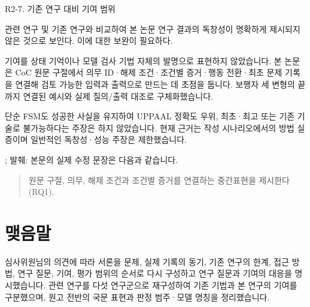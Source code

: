 \clearpage

\begin{reviewitem}{R2-7. 기존 연구 대비 기여 범위}

\begin{reviewercomment}

관련 연구 및 기존 연구와 비교하여 본 논문 연구 결과의 독창성이 명확하게 제시되지 않은 것으로 보인다. 이에 대한 보완이 필요하다.

\end{reviewercomment}

\begin{authorresponse}

기여를 상태 기억이나 모델 검사 기법 자체의 발명으로 표현하지 않았습니다. 본 논문은 CoC 원문 구절에서 의무 ID·해제 조건·조건별 증거·행동 전환·최초 문제 기록을 연결해 검토 가능한 입력과 출력으로 만드는 데 초점을 둡니다. 보행자 세 변형의 끝까지 연결된 예시와 실제 질의/출력 대조로 구체화했습니다.

단순 FSM도 성공한 사실을 유지하여 UPPAAL 정확도 우위, 최초·최고 또는 기존 기술로 불가능하다는 주장은 하지 않았습니다. 현재 근거는 작성 시나리오에서의 방법 실증이며 일반적인 독창성·성능 주장은 제한했습니다.

\end{authorresponse}

\begin{manuscriptrevision}{; 발췌: }
본문의 실제 수정 문장은 다음과 같습니다.

\begin{quote}
원문 구절, 의무, 해제 조건과 조건별 증거를 연결하는 중간표현을 제시한다 (RQ1).
\end{quote}
\end{manuscriptrevision}

\end{reviewitem}

\section*{맺음말}

심사위원님의 의견에 따라 서론을 문제, 실제 기록의 동기, 기존 연구의 한계, 접근 방법, 연구 질문, 기여, 평가 범위의 순서로 다시 구성하고 연구 질문과 기여의 대응을 명시했습니다. 관련 연구를 다섯 연구군으로 재구성하여 기존 기법과 본 연구의 기여를 구분했으며, 원고 전반의 국문 표현과 판정 범주·모델 명칭을 정리했습니다.


